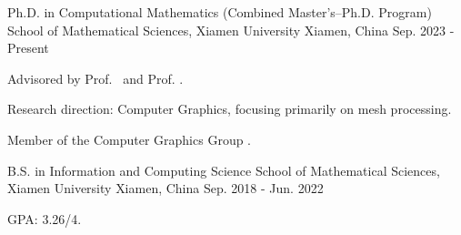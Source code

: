 

\begin{cventries}

  \cventry
    {Ph.D. in Computational Mathematics (Combined Master’s–Ph.D. Program)} %
    {School of Mathematical Sciences, Xiamen University} %
    {Xiamen, China} %
    {Sep. 2023 - Present}
    {
      \begin{cvitems}
        \item {Advisored by Prof. \JuanCao~and Prof. \ZhongguiChen.}
        \item {Research direction: Computer Graphics, focusing primarily on mesh processing.}
        \item {Member of the Computer Graphics Group \emph{\GraphicsXMU}.}
      \end{cvitems}
    }

  \cventry
    {B.S. in Information and Computing Science} %
    {School of Mathematical Sciences, Xiamen University} %
    {Xiamen, China} %
    {Sep. 2018 - Jun. 2022}
    {
      \begin{cvitems} %
        \item {GPA: 3.26/4.}
      \end{cvitems}
    }
\end{cventries}
